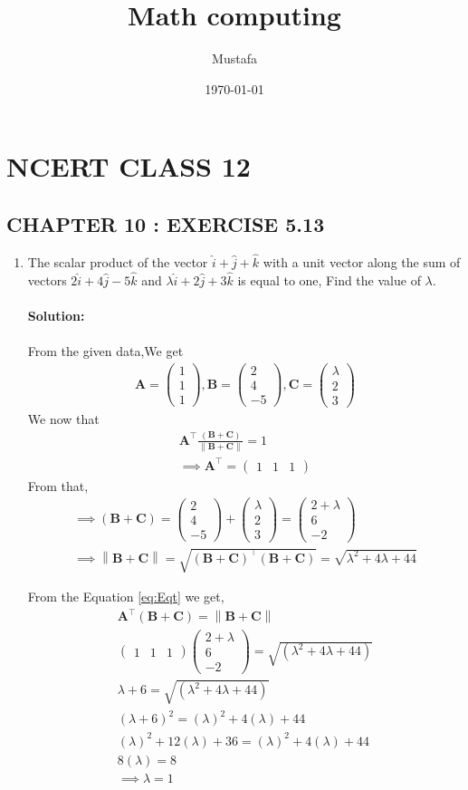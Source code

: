 \documentclass[11pt, a4paper]{article}
\title{ Math computing}
\author{ Mustafa}
\date{\today}
\newcommand{\myvec}[1]{\ensuremath{\begin{pmatrix}#1\end{pmatrix}}}
\let\vec\mathbf
\providecommand{\brak}[1]{\ensuremath{\left(#1\right)}}
\providecommand{\norm}[1]{\left\lVert#1\right\rVert}
\begin{document}
\section*{NCERT CLASS 12}
\subsection*{CHAPTER 10 : EXERCISE 5.13}
\begin{enumerate}
\item\textbf{}The scalar product of the vector $\hat{i}+\hat{j}+\hat{k}$ with a unit vector along the sum of vectors $2\hat{i}+4\hat{j}-5\hat{k}$ and $\lambda\hat{i}+2\hat{j}+3\hat{k}$ is equal to one, Find the value of $\lambda$.
\\\\
\textbf{Solution:}\\\\
From the given data,We get
\begin{align}
\vec{A} =\myvec{1\\1\\1} , \vec{B}=\myvec{2\\4\\-5} , \vec{C}=\myvec{\lambda\\2\\3}
\end{align}
We now that 
\begin{align}
\vec{A}^\top\frac{\brak{\vec{B}+\vec{C}}}{\norm{\vec{B}+\vec{C}}}=1 \label{eq:Eqt}\\
 \implies{\vec{A}^\top=\myvec{1&1&1}}
\end{align}
From that,
\begin{align}
  \implies  \brak{\vec{B}+\vec{C}}=\myvec{2\\4\\-5}+\myvec{\lambda\\2\\3}=\myvec{2+\lambda\\6\\-2}\\
  \implies  \norm{\vec{B}+\vec{C}}={\sqrt{\brak{\vec{B}+\vec{C}}^\top \brak{\vec{B}+\vec{C}}}}={\sqrt{\lambda^2+4\lambda+44}}
\end{align}

From the Equation \eqref{eq:Eqt} we get,
 \begin{align}        
 \vec{A}^\top\brak{\vec{B}+\vec{C}}={\norm{\vec{B}+\vec{C}}}\\        
        \myvec{1&1&1}\myvec{2+ \lambda \\ 6 \\ -2}= {\sqrt{\brak{ \lambda ^2+4 \lambda +44}}} \\
        \lambda +6 = \sqrt{\brak{\lambda ^2+4 \lambda +44}}\\
        \brak{ \lambda +6}^2 = \brak{\lambda} ^2+4 \brak{\lambda} +44\\
       \brak{\lambda}^2+12\brak{ \lambda }+36 = \brak{ \lambda }^2+4 \brak{\lambda} +44\\
     8\brak{\lambda} = 8\\
    \implies    \lambda = 1
 \end{align}
\end{enumerate}
\end{document}
